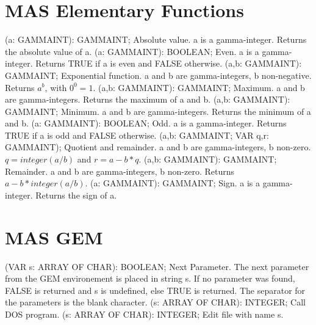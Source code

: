 \section{ MAS Elementary Functions  } 
 (a: GAMMAINT): GAMMAINT; \eproc
\bcom Absolute value. a is a gamma-integer. Returns the absolute value
of a.  \ecom 
{} (a: GAMMAINT): BOOLEAN; \eproc
\bcom Even. a is a gamma-integer. Returns TRUE if a is even and
FALSE otherwise.  \ecom 
{} (a,b: GAMMAINT): GAMMAINT; \eproc
\bcom Exponential function. a and b are gamma-integers, b non-negative.
Returns $a^b$, with $0^0=1$.  \ecom 
{} (a,b: GAMMAINT): GAMMAINT; \eproc
\bcom Maximum. a and b are gamma-integers. Returns the maximum of
a and b.  \ecom 
{} (a,b: GAMMAINT): GAMMAINT; \eproc
\bcom Minimum. a and b are gamma-integers. Returns the minimum
of a and b.  \ecom 
{} (a: GAMMAINT): BOOLEAN; \eproc
\bcom Odd. a is a gamma-integer. Returns TRUE if a is odd and
FALSE otherwise.  \ecom 
{} (a,b: GAMMAINT; VAR q,r: GAMMAINT); \eproc
\bcom Quotient and remainder. a and b are gamma-integers, b non-zero.
$q=integer(a/b)$ and $r=a-b*q$.  \ecom 
{} (a,b: GAMMAINT): GAMMAINT; \eproc
\bcom Remainder. a and b are gamma-integers, b non-zero.
Returns $a-b*integer(a/b)$.  \ecom 
{} (a: GAMMAINT): GAMMAINT; \eproc
\bcom Sign. a is a gamma-integer. Returns the sign of a.  \ecom 
\section{ MAS GEM  } 
 (VAR s: ARRAY OF CHAR): BOOLEAN; \eproc
\bcom Next Parameter. The next parameter from the GEM environement is
placed in string s. If no parameter was found, FALSE is returned
and s is undefined, else TRUE is returned. The separator for the 
parameters is the blank character.  \ecom 
{} (s: ARRAY OF CHAR): INTEGER; \eproc
\bcom Call DOS program.  \ecom 
{} (s: ARRAY OF CHAR): INTEGER; \eproc
\bcom Edit file with name s.  \ecom 

